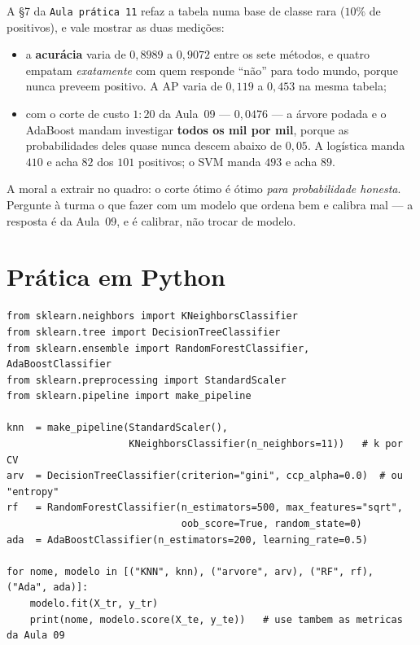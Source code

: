 \documentclass[11pt,a4paper]{article}
\begin{document}
\begin{emsala}
A §7 da \texttt{Aula prática 11} refaz a tabela numa base de classe rara ($10\%$ de
positivos), e vale mostrar as duas medições:

\begin{itemize}[leftmargin=1.2cm,nosep]
  \item a \textbf{acurácia} varia de $0{,}8989$ a $0{,}9072$ entre os sete métodos, e
        quatro empatam \emph{exatamente} com quem responde ``não'' para todo mundo,
        porque nunca preveem positivo. A AP varia de $0{,}119$ a $0{,}453$ na mesma
        tabela;
  \item com o corte de custo $1{:}20$ da Aula~09 --- $0{,}0476$ --- a árvore podada e
        o AdaBoost mandam investigar \textbf{todos os mil por mil}, porque as
        probabilidades deles quase nunca descem abaixo de $0{,}05$. A logística manda
        $410$ e acha $82$ dos $101$ positivos; o SVM manda $493$ e acha $89$.
\end{itemize}

A moral a extrair no quadro: o corte ótimo é ótimo \emph{para probabilidade
honesta}. Pergunte à turma o que fazer com um modelo que ordena bem e calibra mal
--- a resposta é da Aula~09, e é calibrar, não trocar de modelo.
\end{emsala}

\section{Prática em Python}
\begin{lstlisting}
from sklearn.neighbors import KNeighborsClassifier
from sklearn.tree import DecisionTreeClassifier
from sklearn.ensemble import RandomForestClassifier, AdaBoostClassifier
from sklearn.preprocessing import StandardScaler
from sklearn.pipeline import make_pipeline

knn  = make_pipeline(StandardScaler(),
                     KNeighborsClassifier(n_neighbors=11))   # k por CV
arv  = DecisionTreeClassifier(criterion="gini", ccp_alpha=0.0)  # ou "entropy"
rf   = RandomForestClassifier(n_estimators=500, max_features="sqrt",
                              oob_score=True, random_state=0)
ada  = AdaBoostClassifier(n_estimators=200, learning_rate=0.5)

for nome, modelo in [("KNN", knn), ("arvore", arv), ("RF", rf), ("Ada", ada)]:
    modelo.fit(X_tr, y_tr)
    print(nome, modelo.score(X_te, y_te))   # use tambem as metricas da Aula 09
\end{lstlisting}
\end{document}
